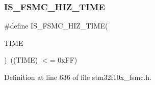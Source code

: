 \subsubsection{\texorpdfstring{I\+S\+\_\+\+F\+S\+M\+C\+\_\+\+H\+I\+Z\+\_\+\+T\+I\+ME}{IS\_FSMC\_HIZ\_TIME}}
{\footnotesize\ttfamily \#define I\+S\+\_\+\+F\+S\+M\+C\+\_\+\+H\+I\+Z\+\_\+\+T\+I\+ME(\begin{DoxyParamCaption}\item[{}]{T\+I\+ME }\end{DoxyParamCaption})~((T\+I\+ME) $<$= 0x\+F\+F)}



Definition at line 636 of file stm32f10x\+\_\+fsmc.\+h.

